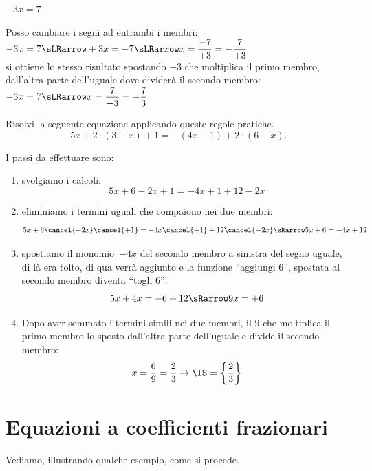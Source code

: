 \begin{esempio}{}{}
\(-3x=7\)

Posso cambiare i segni ad entrambi i membri:
\(-3x=7 \sLRarrow +3x=-7 \sLRarrow x=\dfrac{-7}{+3}=-\dfrac{7}{+3}\)\\
si ottiene lo stesso risultato spostando \(-3\) che moltiplica il primo 
membro, dall'altra parte dell'uguale dove dividerà il secondo membro:
\(-3x=7 \sLRarrow x=\dfrac{7}{-3}=-\dfrac{7}{3}\)
\end{esempio}

\begin{problema}{}{}
 Risolvi la seguente equazione applicando queste regole pratiche.
 \[5x+2\cdot (3-x)+1=-(4x-1)+2\cdot (6-x).\]
\end{problema}

I passi da effettuare sono:
\begin{enumerate}
 \item svolgiamo i calcoli:
 \[5x+6-2x+1=-4x+1+12-2x\]
 \item eliminiamo i termini uguali che compaiono nei due membri:
 \[5x+6 \cancel{-2x}\cancel{+1}=-4x \cancel{+1}+12\cancel{-2x} \sRarrow 
5x+6=-4x+12\]
 \item spostiamo il monomio~\(-4x\) del secondo membro a sinistra del segno 
uguale, di là era tolto, di qua verrà aggiunto
e la funzione ``aggiungi \(6\)'', spostata al secondo membro diventa ``togli 
\(6\)'':
\[5x+4x=-6+12 \sRarrow 9x=+6\]
\item Dopo aver sommato i termini simili nei due membri, il 
\(9\) che moltiplica il primo membro lo sposto dall'altra parte dell'uguale e 
divide il secondo membro:
 \[x=\dfrac{6}{9} = \dfrac{2}{3}\to \IS =\left\{\dfrac{2}{3}\right\}\]
 \end{enumerate}

\section{Equazioni a coefficienti frazionari}
\label{sec:13_coefffraz}

Vediamo, illustrando qualche esempio, come si procede.

